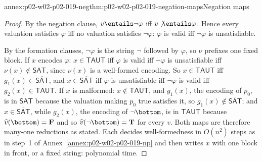 \begin{annexitem}{annex:p02-w02-p02-019-neg}{thm:p02-w02-p02-019-negation-maps}{Negation maps}
\begin{proof}
By the negation clause, \(v\entails\neg\varphi\) iff \(v\not\entails\varphi\).
Hence every valuation satisfies \(\varphi\) iff no valuation satisfies
\(\neg\varphi\): \(\varphi\) is valid iff \(\neg\varphi\) is unsatisfiable.

By the formation clauses, \(\neg\varphi\) is the string \(\neg\) followed by
\(\varphi\), so \(\nu\) prefixes one fixed block.  If \(x\) encodes
\(\varphi\): \(x\in\mathsf{TAUT}\) iff \(\varphi\) is valid iff \(\neg\varphi\)
is unsatisfiable iff \(\nu(x)\notin\mathsf{SAT}\), since \(\nu(x)\) is a
well-formed encoding.  So \(x\in\mathsf{TAUT}\) iff
\(g_1(x)\in\overline{\mathsf{SAT}}\), and \(x\in\overline{\mathsf{SAT}}\)
iff \(\varphi\) is unsatisfiable iff \(\neg\varphi\) is valid iff
\(g_2(x)\in\mathsf{TAUT}\).  If \(x\) is malformed: \(x\notin\mathsf{TAUT}\),
and \(g_1(x)\), the encoding of \(p_0\), is in \(\mathsf{SAT}\) because the
valuation making \(p_0\) true satisfies it, so
\(g_1(x)\notin\overline{\mathsf{SAT}}\); and \(x\in\overline{\mathsf{SAT}}\),
while \(g_2(x)\), the encoding of \(\neg\bottom\), is in \(\mathsf{TAUT}\)
because \(\widehat v(\bottom)=\mathbf{F}\) and so \(\widehat v(\neg\bottom)=\mathbf{T}\)
for every \(v\).  Both maps are therefore many-one reductions as stated.
Each decides well-formedness in \(O(n^2)\) steps as in step~1 of
Annex~\ref{annex:p02-w02-p02-019-np} and then writes \(x\) with one
block in front, or a fixed string: polynomial time.
\end{proof}
\end{annexitem}

